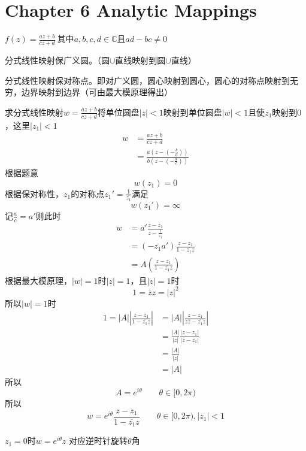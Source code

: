 \section{Chapter 6 Analytic Mappings}
\begin{definition*}
    $f(z)=\frac{az+b}{cz+d}~$其中$a,b,c,d\in\mathbb{C}$且$ad-bc\neq0$
\end{definition*}
\begin{theorem*}
    分式线性映射保广义圆。（圆$\cup$直线映射到圆$\cup$直线）
\end{theorem*}
\begin{theorem*}
    分式线性映射保对称点。即对广义圆，圆心映射到圆心，圆心的对称点映射到无穷，边界映射到边界（可由最大模原理得出）
\end{theorem*}
\begin{homeworkProblem}
求分式线性映射$w=\frac{az+b}{cz+d}$将单位圆盘$|z|<1$映射到单位圆盘$|w|<1$且使$z_1$映射到$0$，这里$|z_1|<1$
\newline
\solution
\[\begin{split}
w &= \frac{az+b}{cz+d}\\
&= \frac{a(z-(-\frac{b}{a}))}{b(z-(-\frac{d}{c}))}
\end{split}\]
根据题意\[w(z_1)=0\]
根据保对称性，$z_1$的对称点$z_1'=\frac{1}{\overline{z_1}}$满足
\[w(z_1')=\infty\]
记$\frac{a}{c}=a'$则此时
\[
\begin{array}{ll}
w &= a'\frac{z-z_1}{z-\frac{1}{\overline{z_1}}} \\
&= (-\overline{z_1}a')\frac{z-z_1}{1-\overline{z_1}z} \\
&= A(\frac{z-z_1}{1-\overline{z_1}z})
\end{array}
\]
根据最大模原理，$|w|=1$时$|z|=1$，且$|z|=1$时
\[
1=\overline{z}z=|z|^2
\]
所以$|w|=1$时
\[
\begin{split}
    1 = |A|\left|\frac{z-z_1}{1-\overline{z_1}z}\right| &= |A|\left|\frac{z-z_1}{z\overline{z}-\overline{z_1}z}\right| \\
    &= \frac{|A|}{|z|}\frac{|z-z_1|}{|\overline{z}-\overline{z_1}|} \\
    &= \frac{|A|}{|z|}\\
    &= |A|
\end{split}
\]
所以
\[
A = e^{i\theta} \qquad \theta\in[0, 2\pi)
\]
所以
\[
 w = e^{i\theta}\frac{z-z_1}{1-\overline{z_1}z} \qquad \theta\in[0,2\pi),|z_1|<1
\]
\end{homeworkProblem}
\begin{corollary*}
 $z_1=0$时$w = e^{i\theta}z$ 对应逆时针旋转$\theta$角
\end{corollary*}
